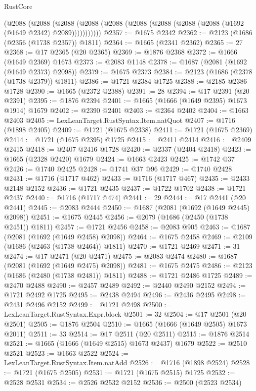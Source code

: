 \begin{lexlean}{RustCore}
\begin{coremodule}
      (@2088
        (@2088
          (@2088 (@2088 (@2088 (@2088 (@2088 (@2088 (@2088 (@1692 (@1649 @2342) @2089)))))))))))
@2357 := @1675 @2342
@2362 := @2123 (@1686 (@2356 (@1738 @2357)) @1811)
@2364 := @1665 (@2341 @2362)
@2365 := 27
@2368 := @17 @2365 (@20 @2365)
@2369 := @1876 @2368
@2372 := @1666 (@1649 @2369) @1673
@2373 := @2083 @1148
@2378 := @1687 (@2081 (@1692 (@1649 @2373) @2098))
@2379 := @1675 @2373
@2384 := @2123 (@1686 (@2378 (@1738 @2379)) @1811)
@2386 := @1721 @2384 @1725
@2388 := @2185 @2386 @1728
@2390 := @1665 (@2372 @2388)
@2391 := 28
@2394 := @17 @2391 (@20 @2391)
@2395 := @1876 @2394
@2401 := @1665 (@1666 (@1649 @2395) @1673 @1914) @1679
@2402 := @2390 @2401
@2403 := @2364 @2402
@2404 := @1663 @2403
@2405 := LexLeanTarget.RustSyntax.Item.natQuot
@2407 := @1716 (@1898 @2405)
@2409 := @1721 (@1675 @2338)
@2411 := @1721 (@1675 @2369)
@2414 := @1721 (@1675 @2395) @1725
@2415 := @2411 @2414
@2416 := @2409 @2415
@2418 := @2407 @2416 @1728
@2420 := @2337 (@2404 @2418)
@2423 := @1665 (@2328 @2420) @1679
@2424 := @1663 @2423
@2425 := @1742 @37
@2426 := @1740 @2425
@2428 := @1741 @37 @96
@2429 := @1740 @2428
@2431 := @1716 (@1717 @462)
@2433 := @1716 (@1717 @467)
@2435 := @2433 @2148 @2152
@2436 := @1721 @2435
@2437 := @1722 @1702
@2438 := @1721 @2437
@2440 := @1716 (@1717 @474)
@2441 := 29
@2444 := @17 @2441 (@20 @2441)
@2445 := @2083 @2444
@2450 := @1687 (@2081 (@1692 (@1649 @2445) @2098))
@2451 := @1675 @2445
@2456 := @2079 (@1686 (@2450 (@1738 @2451)) @1811)
@2457 := @1721 @2456
@2458 := @2083 @905
@2463 := @1687 (@2081 (@1692 (@1649 @2458) @2098))
@2464 := @1675 @2458
@2469 := @2109 (@1686 (@2463 (@1738 @2464)) @1811)
@2470 := @1721 @2469
@2471 := 31
@2474 := @17 @2471 (@20 @2471)
@2475 := @2083 @2474
@2480 := @1687 (@2081 (@1692 (@1649 @2475) @2098))
@2481 := @1675 @2475
@2486 := @2123 (@1686 (@2480 (@1738 @2481)) @1811)
@2488 := @1721 @2486 @1725
@2489 := @2470 @2488
@2490 := @2457 @2489
@2492 := @2440 @2490 @2152
@2494 := @1721 @2492 @1725
@2495 := @2438 @2494
@2496 := @2436 @2495
@2498 := @2431 @2496 @2152
@2499 := @1721 @2498
@2500 := LexLeanTarget.RustSyntax.Expr.block
@2501 := 32
@2504 := @17 @2501 (@20 @2501)
@2505 := @1876 @2504
@2510 := @1665 (@1666 (@1649 @2505) @1673 @2011)
@2511 := 33
@2514 := @17 @2511 (@20 @2511)
@2515 := @1876 @2514
@2521 := @1665 (@1666 (@1649 @2515) @1673 @2437) @1679
@2522 := @2510 @2521
@2523 := @1663 @2522
@2524 := LexLeanTarget.RustSyntax.Item.natAdd
@2526 := @1716 (@1898 @2524)
@2528 := @1721 (@1675 @2505)
@2531 := @1721 (@1675 @2515) @1725
@2532 := @2528 @2531
@2534 := @2526 @2532 @2152
@2536 := @2500 (@2523 @2534)

\end{coremodule}
\end{lexlean}
